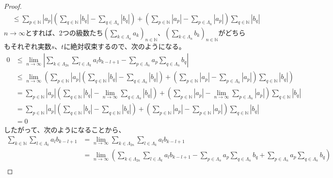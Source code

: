 \documentclass[dvipdfmx]{jsarticle}
\begin{document}
\begin{proof}
\begin{align*}
&\leq \sum_{p \in \mathbb{N}} \left| a_{p} \right|\left( \sum_{q \in \mathbb{N}} \left| b_{q} \right| - \sum_{q \in \varLambda_{n}} \left| b_{q} \right| \right) + \left( \sum_{p \in \mathbb{N}} \left| a_{p} \right| - \sum_{p \in \varLambda_{n}} \left| a_{p} \right| \right)\sum_{q \in \mathbb{N}} \left| b_{q} \right|
\end{align*}
$n \rightarrow \infty$とすれば、2つの級数たち$\left( \sum_{k \in \varLambda_{n}} a_{k} \right)_{n \in \mathbb{N}}$、$\left( \sum_{k \in \varLambda_{n}} b_{k} \right)_{n \in \mathbb{N}}$がどちらもそれぞれ実数$s$、$t$に絶対収束するので、次のようになる。
\begin{align*}
0 &\leq \lim_{n \rightarrow \infty}\left| \sum_{k \in \varLambda_{2n}} {\sum_{l \in \varLambda_{k}} {a_{l}b_{k - l + 1}}} - \sum_{p \in \varLambda_{n}} a_{p}\sum_{q \in \varLambda_{n} } b_{q} \right|\\
&\leq \lim_{n \rightarrow \infty}\left( \sum_{p \in \mathbb{N}} \left| a_{p} \right|\left( \sum_{q \in \mathbb{N}} \left| b_{q} \right| - \sum_{q \in \varLambda_{n}} \left| b_{q} \right| \right) + \left( \sum_{p \in \mathbb{N}} \left| a_{p} \right| - \sum_{p \in \varLambda_{n}} \left| a_{p} \right| \right)\sum_{q \in \mathbb{N}} \left| b_{q} \right| \right)\\
&= \sum_{p \in \mathbb{N}} \left| a_{p} \right|\left( \sum_{q \in \mathbb{N}} \left| b_{q} \right| - \lim_{n \rightarrow \infty}{\sum_{q \in \varLambda_{n}} \left| b_{q} \right|} \right) + \left( \sum_{p \in \mathbb{N}} \left| a_{p} \right| - \lim_{n \rightarrow \infty}{\sum_{p \in \varLambda_{n}} \left| a_{p} \right|} \right)\sum_{q \in \mathbb{N}} \left| b_{q} \right|\\
&= \sum_{p \in \mathbb{N}} \left| a_{p} \right|\left( \sum_{q \in \mathbb{N}} \left| b_{q} \right| - \sum_{q \in \mathbb{N}} \left| b_{q} \right| \right) + \left( \sum_{p \in \mathbb{N}} \left| a_{p} \right| - \sum_{p \in \mathbb{N}} \left| a_{p} \right| \right)\sum_{q \in \mathbb{N}} \left| b_{q} \right|\\
&= 0
\end{align*}
したがって、次のようになることから、
\begin{align*}
\sum_{k \in \mathbb{N}} {\sum_{l \in \varLambda_{k}} {a_{l}b_{k - l + 1}}} &= \lim_{n \rightarrow \infty}{\sum_{k \in \varLambda_{2n}} {\sum_{l \in \varLambda_{k}} {a_{l}b_{k - l + 1}}}}\\
&= \lim_{n \rightarrow \infty}\left( \sum_{k \in \varLambda_{2n}} {\sum_{l \in \varLambda_{k}} {a_{l}b_{k - l + 1}}} - \sum_{p \in \varLambda_{n}} a_{p}\sum_{q \in \varLambda_{n} } b_{q} + \sum_{p \in \varLambda_{n}} a_{p}\sum_{q \in \varLambda_{n} } b_{q} \right)\\

\end{align*}
\end{proof}
\end{document}
